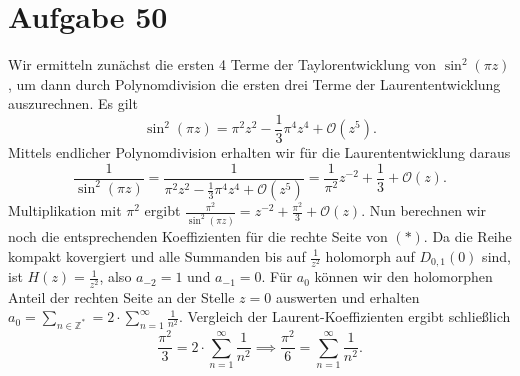 \documentclass{article}
\theoremstyle{definition}
\newcommand{\Z}{\mathbb{Z}}
\begin{document}
\section*{Aufgabe 50}
Wir ermitteln zunächst die ersten 4 Terme der Taylorentwicklung von $\sin^2(\pi z)$, um dann durch Polynomdivision die ersten drei Terme der Laurententwicklung auszurechnen.
Es gilt
\[
	\sin^2(\pi z) = \pi^2z^2 - \frac{1}{3} \pi^4z^4 + \mathcal{O}(z^5).
\]
Mittels endlicher Polynomdivision erhalten wir für die Laurententwicklung daraus
\[
	\frac{1}{\sin^2(\pi z)} = \frac{1}{\pi^2z^2 - \frac{1}{3} \pi^4z^4 + \mathcal{O}(z^5)} = \frac{1}{\pi^2}z^{-2} + \frac{1}{3} + \mathcal{O}(z).	
\]
Multiplikation mit $\pi^2$ ergibt $\frac{\pi^2}{\sin^2(\pi z)} = z^{-2} + \frac{\pi^2}{3} + \mathcal{O}(z)$.
Nun berechnen wir noch die entsprechenden Koeffizienten für die rechte Seite von $(*)$. Da die Reihe kompakt kovergiert und alle Summanden bis auf $\frac{1}{z^2}$ holomorph auf $D_{0,1}(0)$ sind, ist $H(z) = \frac{1}{z^2}$, also $a_{-2} = 1$ und $a_{-1} = 0$. Für $a_0$ können wir den holomorphen Anteil der rechten Seite an der Stelle $z = 0$ auswerten und erhalten $a_0 = \sum_{n \in \Z^*} = 2\cdot \sum_{n = 1}^{\infty}\frac{1}{n^2}$. Vergleich der Laurent-Koeffizienten ergibt schließlich \[\frac{\pi^2}{3} = 2 \cdot \sum_{n = 1}^{\infty}\frac{1}{n^2} \implies \frac{\pi^2}{6} = \sum_{n = 1}^{\infty}\frac{1}{n^2}.\]
\end{document}
